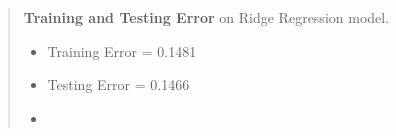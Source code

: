 \begin{quote}
    {\bf Training and Testing Error} on Ridge Regression model.
    \begin{itemize}
	\item[] Training Error = 0.1481
	\item[] Testing Error = 0.1466
    \item[]
    \end{itemize}
\end{quote}

